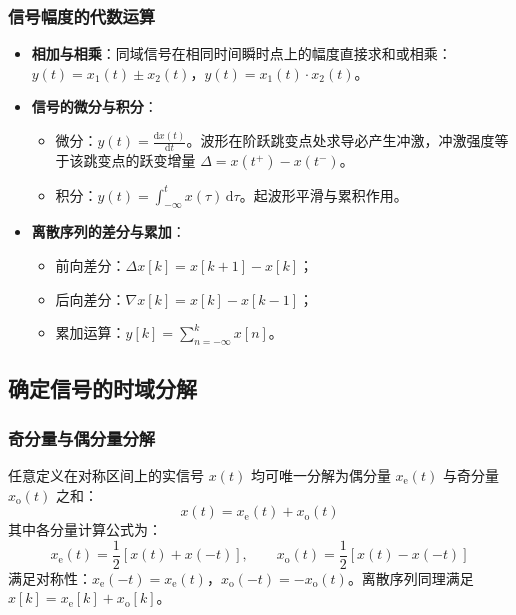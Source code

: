 \documentclass[11pt,a4paper,fontset=fandol]{ctexart}
\theoremstyle{remark}
\begin{document}
\subsubsection{信号幅度的代数运算}
\begin{itemize}
    \item \textbf{相加与相乘}：同域信号在相同时间瞬时点上的幅度直接求和或相乘：$y(t) = x_1(t) \pm x_2(t)$，$y(t) = x_1(t) \cdot x_2(t)$。
    \item \textbf{信号的微分与积分}：
    \begin{itemize}
        \item 微分：$y(t) = \frac{\mathrm{d}x(t)}{\mathrm{d}t}$。波形在阶跃跳变点处求导必产生冲激，冲激强度等于该跳变点的跃变增量 $\Delta = x(t^+) - x(t^-)$。
        \item 积分：$y(t) = \int_{-\infty}^t x(\tau)\,\mathrm{d}\tau$。起波形平滑与累积作用。
    \end{itemize}
    \item \textbf{离散序列的差分与累加}：
    \begin{itemize}
        \item 前向差分：$\Delta x[k] = x[k + 1] - x[k]$；
        \item 后向差分：$\nabla x[k] = x[k] - x[k - 1]$；
        \item 累加运算：$y[k] = \sum_{n=-\infty}^k x[n]$。
    \end{itemize}
\end{itemize}

\subsection{确定信号的时域分解}

\subsubsection{奇分量与偶分量分解}
任意定义在对称区间上的实信号 $x(t)$ 均可唯一分解为偶分量 $x_{\mathrm{e}}(t)$ 与奇分量 $x_{\mathrm{o}}(t)$ 之和：
\begin{equation}
    x(t) = x_{\mathrm{e}}(t) + x_{\mathrm{o}}(t)
\end{equation}
其中各分量计算公式为：
\begin{equation}
    x_{\mathrm{e}}(t) = \frac{1}{2}[x(t) + x(-t)], \qquad x_{\mathrm{o}}(t) = \frac{1}{2}[x(t) - x(-t)]
\end{equation}
满足对称性：$x_{\mathrm{e}}(-t) = x_{\mathrm{e}}(t)$，$x_{\mathrm{o}}(-t) = -x_{\mathrm{o}}(t)$。离散序列同理满足 $x[k] = x_{\mathrm{e}}[k] + x_{\mathrm{o}}[k]$。
\end{document}
